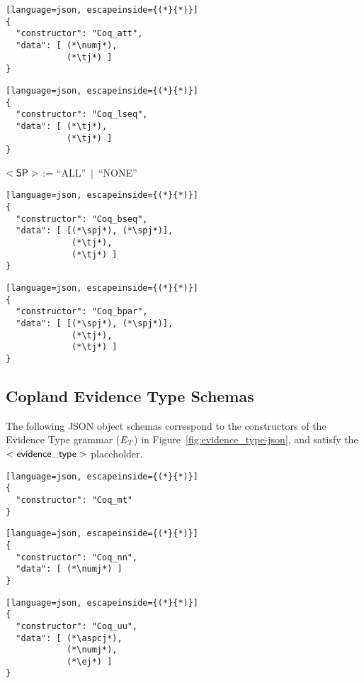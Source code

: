 \begin{lstlisting}[language=json, escapeinside={(*}{*)}]
{
  "constructor": "Coq_att",
  "data": [ (*\numj*),
            (*\tj*) ]
}
\end{lstlisting}
  
\begin{lstlisting}[language=json, escapeinside={(*}{*)}]
{
  "constructor": "Coq_lseq",
  "data": [ (*\tj*),
            (*\tj*) ]
}
\end{lstlisting}

\vspace{2mm}

\noindent $\mathsf{<SP>}$ := ``ALL''~$\mid$~``NONE'' \\

\begin{lstlisting}[language=json, escapeinside={(*}{*)}]
{
  "constructor": "Coq_bseq",
  "data": [ [(*\spj*), (*\spj*)],
             (*\tj*),
             (*\tj*) ]
}
\end{lstlisting}

\begin{lstlisting}[language=json, escapeinside={(*}{*)}]
{
  "constructor": "Coq_bpar",
  "data": [ [(*\spj*), (*\spj*)],
             (*\tj*),
             (*\tj*) ]
}
\end{lstlisting}

\newpage

\subsection{Copland Evidence Type Schemas}
The following JSON object schemas correspond to the constructors of
the Evidence Type grammar ($\mathsf{\emph{E}_\emph{T}}$) in Figure~\ref{fig:evidence_type-json}, and satisfy the $\mathsf{<evidence\_type>}$ placeholder.


\begin{lstlisting}[language=json, escapeinside={(*}{*)}]
{
  "constructor": "Coq_mt"
}
\end{lstlisting}

\begin{lstlisting}[language=json, escapeinside={(*}{*)}]
{
  "constructor": "Coq_nn",
  "data": [ (*\numj*) ]
}
\end{lstlisting}

\begin{lstlisting}[language=json, escapeinside={(*}{*)}]
{
  "constructor": "Coq_uu",
  "data": [ (*\aspcj*),
            (*\numj*),
            (*\ej*) ]
}
\end{lstlisting}

